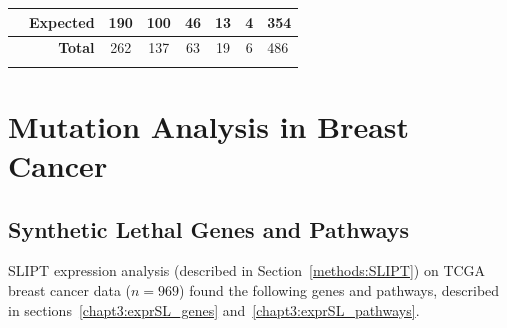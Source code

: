 \begin{table}[!ht]
\begin{center}
\begin{tabular}{>{\cellcolor{white}}rrcccccl}
\rowcolor{black!10}
\multicolumn{1}{r|}{\cellcolor{white}\multirow{-2}{*}{\bfseries SLIPT$-$}}  & \multicolumn{1}{r|}{Expected}                             & 190                      & 100                      & 46                      & 13                      & \multicolumn{1}{c|}{4}   & \multicolumn{1}{l|}{\multirow{-2}{*}{354}} \\ \cline{2-8} 
\rowcolor{black!5}
\cellcolor{white}                                                           & \multicolumn{1}{r|}{\cellcolor{white} \bfseries Total}    & \multicolumn{1}{c}{262} & \multicolumn{1}{c}{137} & \multicolumn{1}{c}{63} & \multicolumn{1}{c}{19} & \multicolumn{1}{c|}{6}   & \multicolumn{1}{l|}{486}                  \\ \cline{3-8} 
\end{tabular} 
\end{center}
\end{table}
\fi

\chapter{Mutation Analysis in Breast Cancer}
\label{appendix:mtSL}

\section{Synthetic Lethal Genes and Pathways} \label{appendix:mtSL_genes}

SLIPT expression analysis (described in Section~\ref{methods:SLIPT}) on \gls{TCGA} breast cancer data ($n = 969$) found the following genes and pathways, described in sections~\ref{chapt3:exprSL_genes} and~\ref{chapt3:exprSL_pathways}.


